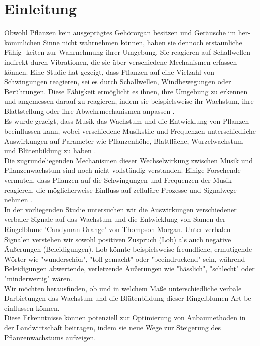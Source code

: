 \section{Einleitung}
   Obwohl Pflanzen kein ausgeprägtes Gehörorgan besitzen und Geräusche im her- kömmlichen Sinne nicht wahrnehmen können, haben sie dennoch erstaunliche Fähig- keiten zur Wahrnehmung ihrer Umgebung. Sie reagieren auf Schallwellen indirekt durch Vibrationen, die sie über verschiedene Mechanismen erfassen können. Eine Studie hat gezeigt, dass Pflanzen auf eine Vielzahl von Schwingungen reagieren, sei es durch Schallwellen, Windbewegungen oder Berührungen. Diese Fähigkeit ermöglicht es ihnen, ihre Umgebung zu erkennen und angemessen darauf zu reagieren, indem sie beispielsweise ihr Wachstum, ihre Blattstellung oder ihre Abwehrmechanismen anpassen \cite{bachmann-wampfler2022}. \\
   
   Es wurde gezeigt, dass Musik das Wachstum und die Entwicklung von Pflanzen beeinflussen kann, wobei verschiedene Musikstile und Frequenzen unterschiedliche Auswirkungen auf Parameter wie Pflanzenhöhe, Blattfläche, Wurzelwachstum und Blütenbildung zu haben \cite{chowdhury-gupta2015}. \\
   
   Die zugrundeliegenden Mechanismen dieser Wechselwirkung zwischen Musik und Pflanzenwachstum sind noch nicht vollständig verstanden. Einige Forschende vermuten, dass Pflanzen auf die Schwingungen und Frequenzen der Musik reagieren, die möglicherweise Einfluss auf zelluläre Prozesse und Signalwege nehmen \cite{gagliano2013}. \\
   
   In der vorliegenden Studie untersuchen wir die Auswirkungen verschiedener verbaler Signale auf das Wachstum und die Entwicklung von Samen der Ringelblume 'Candyman Orange' von Thompson Morgan. Unter verbalen Signalen verstehen wir sowohl positiven Zuspruch (Lob) als auch negative Äußerungen (Beleidigungen). Lob könnte beispielsweise freundliche, ermutigende Wörter wie "wunderschön", "toll gemacht" oder "beeindruckend" sein, während Beleidigungen abwertende, verletzende Äußerungen wie "hässlich", "schlecht" oder "minderwertig" wären. \\
    
    Wir möchten herausfinden, ob und in welchem Maße unterschiedliche verbale Darbietungen das Wachstum und die Blütenbildung dieser Ringelblumen-Art be-einflussen können. \\

    Diese Erkenntnisse können potenziell zur Optimierung von Anbaumethoden in der Landwirtschaft beitragen, indem sie neue Wege zur Steigerung des Pflanzenwachstums aufzeigen.